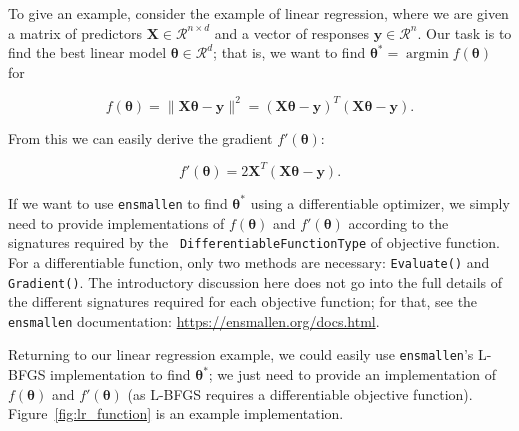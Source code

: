 To give an example, consider the example of linear regression, where we are
given a matrix of predictors $\bm X \in \mathcal{R}^{n \times d}$ and a vector
of responses $\bm y \in \mathcal{R}^n$.  Our task is to find the best linear
model $\bm \theta \in \mathcal{R}^d$; that is, we want to find $\bm \theta^* =
\operatorname{argmin} f(\bm \theta)$ for

\begin{equation}
f(\bm \theta) = \| \bm X \bm \theta - \bm y \|^2 = (\bm X \bm \theta - \bm y)^T
(\bm X \bm \theta - \bm y).
\label{eqn:obj_lr}
\end{equation}

From this we can easily derive the gradient $f'(\bm \theta)$:

\begin{equation}
f'(\bm \theta) = 2 \bm X^T (\bm X \bm \theta - \bm y).
\label{eqn:grad_lr}
\end{equation}

If we want to use {\tt ensmallen} to find $\bm \theta^*$ using a differentiable
optimizer, we simply need to provide implementations of $f(\bm \theta)$ and
$f'(\bm \theta)$ according to the signatures required by the {\tt
DifferentiableFunctionType} of objective function.  For a differentiable
function, only two methods are necessary: {\tt Evaluate()} and {\tt Gradient()}.
The introductory discussion here does not go into the full details of the
different signatures required for each objective function; for that, see the
{\tt ensmallen} documentation: \url{https://ensmallen.org/docs.html}.

Returning to our linear regression example, we could easily use {\tt ensmallen}'s
L-BFGS implementation to find $\bm \theta^*$; we just need to provide an
implementation of $f(\bm \theta)$ and $f'(\bm \theta)$ (as L-BFGS requires a
differentiable objective function).  Figure~\ref{fig:lr_function} is an example
implementation.


